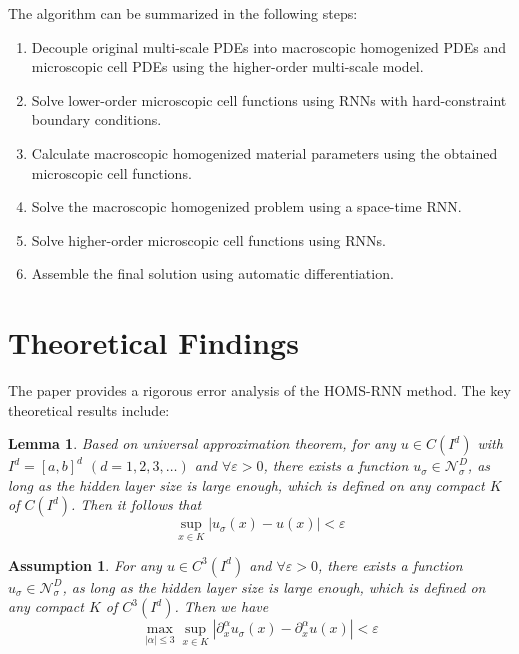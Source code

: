 \documentclass[11pt]{article}
\newtheorem{lemma}{Lemma}
\newtheorem{assumption}{Assumption}
\begin{document}
The algorithm can be summarized in the following steps:
\begin{enumerate}
    \item Decouple original multi-scale PDEs into macroscopic homogenized PDEs and microscopic cell PDEs using the higher-order multi-scale model.
    \item Solve lower-order microscopic cell functions using RNNs with hard-constraint boundary conditions.
    \item Calculate macroscopic homogenized material parameters using the obtained microscopic cell functions.
    \item Solve the macroscopic homogenized problem using a space-time RNN.
    \item Solve higher-order microscopic cell functions using RNNs.
    \item Assemble the final solution using automatic differentiation.
\end{enumerate}

\section{Theoretical Findings}

The paper provides a rigorous error analysis of the HOMS-RNN method. The key theoretical results include:

\begin{lemma}
Based on universal approximation theorem, for any $u \in C(I^d)$ with $I^d = [a,b]^d$ $(d = 1,2,3,\ldots)$ and $\forall \varepsilon > 0$, there exists a function $u_\sigma \in \mathcal{N}^D_\sigma$, as long as the hidden layer size is large enough, which is defined on any compact $K$ of $C(I^d)$. Then it follows that
\begin{equation}
\sup_{x \in K} |u_\sigma(x) - u(x)| < \varepsilon
\end{equation}
\end{lemma}

\begin{assumption}
For any $u \in C^3(I^d)$ and $\forall \varepsilon > 0$, there exists a function $u_\sigma \in \mathcal{N}^D_\sigma$, as long as the hidden layer size is large enough, which is defined on any compact $K$ of $C^3(I^d)$. Then we have
\begin{equation}
\max_{|\alpha| \leq 3} \sup_{x \in K} |\partial^\alpha_x u_\sigma(x) - \partial^\alpha_x u(x)| < \varepsilon
\end{equation}
\end{assumption}
\end{document}
